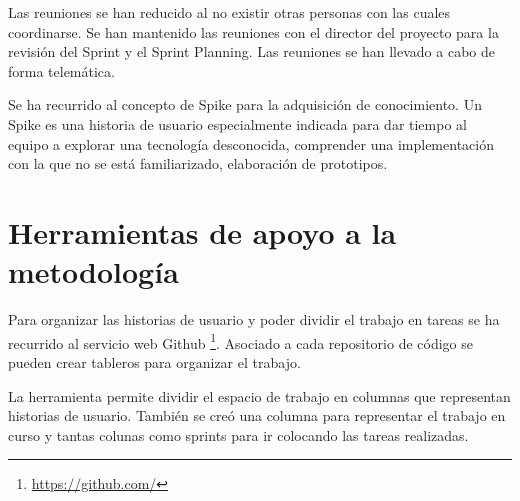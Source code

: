 Las reuniones se han reducido al no existir otras personas con las cuales coordinarse. Se han mantenido las reuniones con el director del proyecto para la revisión del Sprint y el Sprint Planning. Las reuniones se han llevado a cabo de forma telemática.

Se ha recurrido al concepto de Spike para la adquisición de conocimiento. Un Spike es una historia de usuario especialmente indicada para dar tiempo al equipo a explorar una tecnología desconocida, comprender una implementación con la que no se está familiarizado, elaboración de prototipos.

\section{Herramientas de apoyo a la metodología}

Para organizar las historias de usuario y poder dividir el trabajo en tareas se ha recurrido al servicio web Github \footnote{\url{https://github.com/}}. Asociado a cada repositorio de código se pueden crear tableros para organizar el trabajo.

La herramienta permite dividir el espacio de trabajo en columnas que representan historias de usuario. También se creó una columna para representar el trabajo en curso y tantas colunas como sprints para ir colocando las tareas realizadas.








